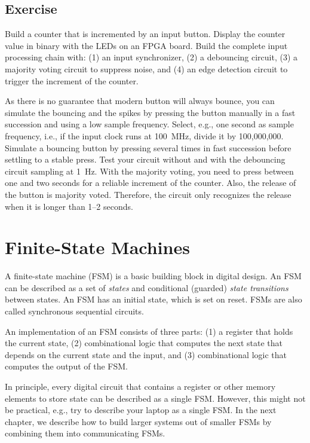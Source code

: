 \documentclass[%
    10pt,
    headinclude, footexclude,
    openright, %
    notitlepage,
    cleardoubleempty,
    headsepline,
    pointlessnumbers,
    bibtotoc, idxtotoc,
    ]{scrbook}
\begin{document}



\section{Exercise}

Build a counter that is incremented by an input button.
Display the counter value in binary with the LEDs on an FPGA board.
Build the complete input processing chain with: (1) an input synchronizer,
(2) a debouncing circuit, (3) a majority voting circuit to suppress noise,
and (4) an edge detection circuit to trigger the increment of the counter.

As there is no guarantee that modern button will always bounce, you can
simulate the bouncing and the spikes by pressing the button manually in a fast succession
and using a low sample frequency. Select, e.g., one second as sample frequency,
i.e., if the input clock runs at 100~MHz, divide it by 100,000,000.
Simulate a bouncing button by pressing several times in fast succession
before settling to a stable press. Test your circuit without and with the
debouncing circuit sampling at 1~Hz.
With the majority voting, you need to press between one and two seconds
for a reliable increment of the counter. Also, the release of the button is
majority voted. Therefore, the circuit only recognizes the release when it is
longer than 1--2 seconds.

\chapter{Finite-State Machines}

A finite-state machine (FSM) is a basic building block in digital design.
An FSM can be described as a set of \emph{states} and conditional (guarded)
\emph{state transitions} between states. 
An FSM has an initial state, which is set on reset.
FSMs are also called synchronous sequential circuits.

An implementation of an FSM consists of three parts: (1) a register that holds the current state,
(2) combinational logic that computes the next state that depends on the current
state and the input, and (3) combinational logic that computes the output of the FSM.

In principle, every digital circuit that contains a register or other memory elements
to store state can be described as a single FSM. However, this might
not be practical, e.g., try to describe your laptop as a single FSM.
In the next chapter, we describe how to build larger systems
out of smaller FSMs by combining them into communicating FSMs.
\end{document}
